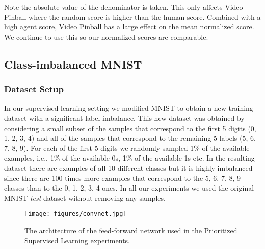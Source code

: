 \documentclass[a4paper]{article}
\begin{document}
Note the absolute value of the denominator is taken.  This only affects Video Pinball where the random score is higher than the human score.  Combined with a high agent score, Video Pinball has a large effect on the mean normalized score.  We continue to use this so our normalized scores are comparable.

\subsection{Class-imbalanced MNIST}
\label{app-mnist-details}
\subsubsection{Dataset Setup}
In our supervised learning setting we modified MNIST to obtain a new training dataset with a significant label imbalance. This new dataset was obtained by considering a small subset of the samples that correspond to the first 5 digits (0, 1, 2, 3, 4) and all of the samples that correspond to the remaining 5 labels (5, 6, 7, 8, 9). For each of the first 5 digits we randomly sampled 1\% of the available examples, i.e., 1\% of the available 0s, 1\% of the available 1s etc. In the resulting dataset there are examples of all 10 different classes but it is highly imbalanced since there are 100 times more examples that correspond to the 5, 6, 7, 8, 9 classes than to the 0, 1, 2, 3, 4 ones. In all our experiments we used the original MNIST \emph{test} dataset without removing any samples. 

\begin{figure}[!h]
\centerline{
\texttt{[image: figures/convnet.jpg]}
}
\caption{
\label{convolutional-network}
}
The architecture of the feed-forward network used in the Prioritized Supervised Learning experiments.
\end{figure}
\end{document}
